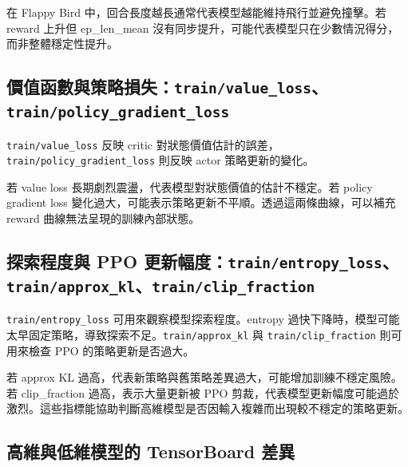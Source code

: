 \documentclass[12pt,a4paper]{ctexart}
\begin{document}
在 Flappy Bird 中，回合長度越長通常代表模型越能維持飛行並避免撞擊。若 reward 上升但 ep\_len\_mean 沒有同步提升，可能代表模型只在少數情況得分，而非整體穩定性提升。

\subsection{價值函數與策略損失：\texttt{train/value\_loss}、\texttt{train/policy\_gradient\_loss}}

\texttt{train/value\_loss} 反映 critic 對狀態價值估計的誤差，\texttt{train/policy\_gradient\_loss} 則反映 actor 策略更新的變化。

\begin{center}
\end{center}

若 value loss 長期劇烈震盪，代表模型對狀態價值的估計不穩定。若 policy gradient loss 變化過大，可能表示策略更新不平順。透過這兩條曲線，可以補充 reward 曲線無法呈現的訓練內部狀態。

\subsection{探索程度與 PPO 更新幅度：\texttt{train/entropy\_loss}、\texttt{train/approx\_kl}、\texttt{train/clip\_fraction}}

\texttt{train/entropy\_loss} 可用來觀察模型探索程度。entropy 過快下降時，模型可能太早固定策略，導致探索不足。\texttt{train/approx\_kl} 與 \texttt{train/clip\_fraction} 則可用來檢查 PPO 的策略更新是否過大。

\begin{center}
\end{center}

若 approx KL 過高，代表新策略與舊策略差異過大，可能增加訓練不穩定風險。若 clip\_fraction 過高，表示大量更新被 PPO 剪裁，代表模型更新幅度可能過於激烈。這些指標能協助判斷高維模型是否因輸入複雜而出現較不穩定的策略更新。

\subsection{高維與低維模型的 TensorBoard 差異}
\end{document}
